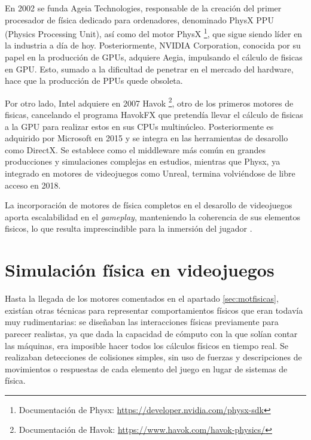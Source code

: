 En 2002 se funda Ageia Technologies, responsable de la creación del primer procesador de física dedicado para ordenadores, denominado PhysX PPU (Physics Processing Unit), así como del motor PhysX \footnote{Documentación de Physx: \url{https://developer.nvidia.com/physx-sdk}}, que sigue siendo líder en la industria a día de hoy. Posteriormente, NVIDIA Corporation, conocida por su papel en la producción de GPUs, adquiere Aegia, impulsando el cálculo de fisicas en GPU. Esto, sumado a la dificultad de penetrar en el mercado del hardware, hace que la producción de PPUs quede obsoleta. \newline %

Por otro lado, Intel adquiere en 2007 Havok \footnote{Documentación de Havok: \url{https://www.havok.com/havok-physics/}}, otro de los primeros motores de fisicas, cancelando el programa HavokFX que pretendía llevar el cálculo de fisicas a la GPU para realizar estos en sus CPUs multinúcleo. Posteriormente es adquirido por Microsoft en 2015 y se integra en las herramientas de desarollo como DirectX. Se establece como el middleware más común en grandes producciones y simulaciones complejas en estudios, mientras que Physx, ya integrado en motores de videojuegos como Unreal, termina volviéndose de libre acceso en 2018.\newline

La incorporación de motores de física completos en el desarollo de videojuegos aporta escalabilidad en el \textit{gameplay}, manteniendo la coherencia de sus elementos fisicos, lo que resulta imprescindible para la inmersión del jugador \cite{hecker2000physics}.  \newline

\section{Simulación física en videojuegos}
Hasta la llegada de los motores comentados en el apartado \ref{sec:motfisicas}, existían otras técnicas para representar comportamientos físicos que eran todavía muy rudimentarias: se diseñaban las interacciones físicas previamente para parecer realistas, ya que dada la capacidad de cómputo con la que solían contar las máquinas, era imposible hacer todos los cálculos físicos en tiempo real. Se realizaban detecciones de colisiones simples, sin uso de fuerzas y descripciones de movimientos o respuestas de cada elemento del juego en lugar de sistemas de física. \newline

